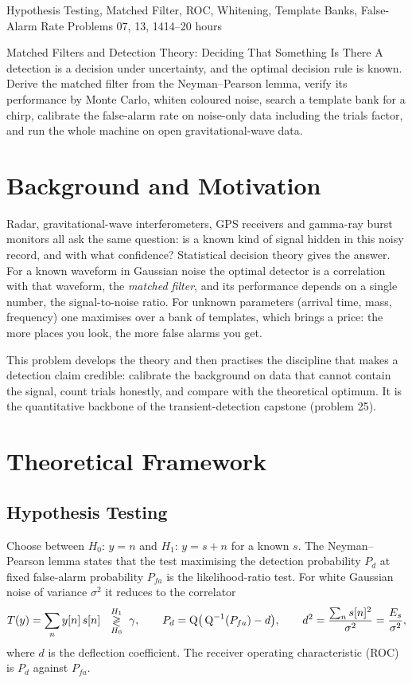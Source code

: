 \documentclass[11pt,a4paper]{article}
\begin{document}
%
{Hypothesis Testing, Matched Filter, ROC, Whitening, Template Banks, False-Alarm Rate}%
{Problems 07, 13, 14}{14--20 hours}

\begin{summarybox}{Matched Filters and Detection Theory: Deciding That Something Is There}
A detection is a decision under uncertainty, and the optimal decision rule is known. Derive the matched filter from the Neyman--Pearson lemma, verify its performance by Monte Carlo, whiten coloured noise, search a template bank for a chirp, calibrate the false-alarm rate on noise-only data including the trials factor, and run the whole machine on open gravitational-wave data.
\end{summarybox}


\section*{Background and Motivation}
Radar, gravitational-wave interferometers, GPS receivers and gamma-ray burst monitors all ask the same question: is a known kind of signal hidden in this noisy record, and with what confidence? Statistical decision theory gives the answer. For a known waveform in Gaussian noise the optimal detector is a correlation with that waveform, the \emph{matched filter}, and its performance depends on a single number, the signal-to-noise ratio. For unknown parameters (arrival time, mass, frequency) one maximises over a bank of templates, which brings a price: the more places you look, the more false alarms you get.

This problem develops the theory and then practises the discipline that makes a detection claim credible: calibrate the background on data that cannot contain the signal, count trials honestly, and compare with the theoretical optimum. It is the quantitative backbone of the transient-detection capstone (problem 25).

\section*{Theoretical Framework}
\subsection{Hypothesis Testing}
Choose between $H_0$: $y=n$ and $H_1$: $y=s+n$ for a known $s$. The Neyman--Pearson lemma states that the test maximising the detection probability $P_d$ at fixed false-alarm probability $P_{fa}$ is the likelihood-ratio test. For white Gaussian noise of variance $\sigma^2$ it reduces to the correlator
\begin{equation}
  T(y)=\sum_ny[n]\,s[n]\ \ \overset{H_1}{\underset{H_0}{\gtrless}}\ \gamma,\qquad
  P_d=\Qfunc\!\big(\Qfunc^{-1}(P_{fa})-d\big),\qquad d^2=\frac{\sum_ns[n]^2}{\sigma^2}=\frac{E_s}{\sigma^2},
  \label{eq:np}
\end{equation}
where $d$ is the deflection coefficient. The receiver operating characteristic (ROC) is $P_d$ against $P_{fa}$.
\end{document}
